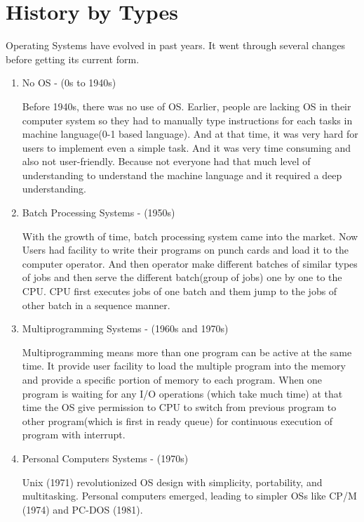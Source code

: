 \newpage
\section{History by Types}

Operating Systems have evolved in past years. It went through several changes before getting its current form. 

\begin{enumerate}
    \item No OS - (0s to 1940s)
    
    Before 1940s, there was no use of OS. Earlier, people are lacking OS in their computer system so they had to manually type instructions for each tasks in machine language(0-1 based language). And at that time, it was very hard for users to implement even a simple task. And it was very time consuming and also not user-friendly. Because not everyone had that much level of understanding to understand the machine language and it required a deep understanding.

    \item Batch Processing Systems - (1950s)
    
    With the growth of time, batch processing system came into the market. Now Users had facility to write their programs on punch cards and load it to the computer operator. And then operator make different batches of similar types of jobs and then serve the different batch(group of jobs) one by one to the CPU. CPU first executes jobs of one batch and them jump to the jobs of other batch in a sequence manner.

    \item Multiprogramming Systems - (1960s and 1970s)
    
    Multiprogramming means more than one program can be active at the same time. It provide user facility to load the multiple program into the memory and provide a specific portion of memory to each program. When one program is waiting for any I/O operations (which take much time) at that time the OS give permission to CPU to switch from previous program to other program(which is first in ready queue) for continuous execution of program with interrupt.

    \item Personal Computers Systems - (1970s)
    
    Unix (1971) revolutionized OS design with simplicity, portability, and multitasking. Personal computers emerged, leading to simpler OSs like CP/M (1974) and PC-DOS (1981).


\end{enumerate}
